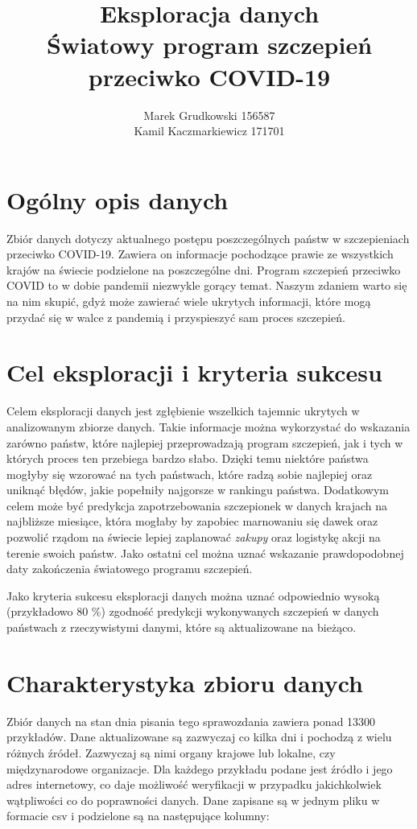 \documentclass[12pt, oneside]{article}
\title{
	Eksploracja danych \\
	Światowy program szczepień przeciwko COVID-19
}
\author{
	Marek Grudkowski 156587
	\\
	Kamil Kaczmarkiewicz 171701
}
\begin{document}
\maketitle

\section{Ogólny opis danych}

Zbiór danych dotyczy aktualnego postępu poszczególnych państw w szczepieniach przeciwko COVID-19. Zawiera on informacje pochodzące prawie ze wszystkich krajów na świecie podzielone na poszczególne dni. Program szczepień przeciwko COVID to w dobie pandemii niezwykle gorący temat. Naszym zdaniem warto się na nim skupić, gdyż może zawierać wiele ukrytych informacji, które mogą przydać się w walce z pandemią i przyspieszyć sam proces szczepień. 

\section{Cel eksploracji i kryteria sukcesu}

Celem eksploracji danych jest zgłębienie wszelkich tajemnic ukrytych w analizowanym zbiorze danych. Takie informacje można wykorzystać do wskazania zarówno państw, które najlepiej przeprowadzają program szczepień, jak i tych w których proces ten przebiega bardzo słabo. Dzięki temu niektóre państwa mogłyby się wzorować na tych państwach, które radzą sobie najlepiej oraz uniknąć błędów, jakie popełniły najgorsze w rankingu państwa.  Dodatkowym celem może być predykcja zapotrzebowania szczepionek w danych krajach na najbliższe miesiące, która mogłaby by zapobiec marnowaniu się dawek oraz pozwolić rządom na świecie lepiej zaplanować \textit{zakupy} oraz logistykę akcji na terenie swoich państw.  Jako ostatni cel można uznać wskazanie prawdopodobnej daty zakończenia światowego programu szczepień. 
\par
Jako kryteria sukcesu eksploracji danych można uznać odpowiednio wysoką (przykładowo $80$ \%) zgodność predykcji wykonywanych szczepień w danych państwach z rzeczywistymi danymi, które są aktualizowane na bieżąco. 

\newpage

\section{Charakterystyka zbioru danych}
Zbiór danych na stan dnia pisania tego sprawozdania zawiera ponad 13300 przykładów. Dane aktualizowane są zazwyczaj co kilka dni i pochodzą z wielu różnych źródeł. Zazwyczaj są nimi organy krajowe lub lokalne, czy międzynarodowe organizacje. Dla każdego przykładu podane jest źródło i jego adres internetowy, co daje możliwość weryfikacji w przypadku jakichkolwiek wątpliwości co do poprawności danych. Dane zapisane są w jednym pliku w formacie csv i podzielone są na następujące kolumny:
\end{document}
